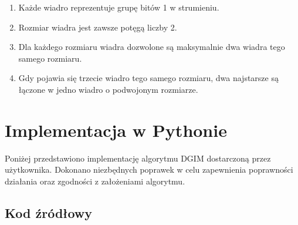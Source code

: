 \documentclass{article}
\begin{document}
\begin{enumerate}
    \item Każde wiadro reprezentuje grupę bitów 1 w strumieniu.
    \item Rozmiar wiadra jest zawsze potęgą liczby 2.
    \item Dla każdego rozmiaru wiadra dozwolone są maksymalnie dwa wiadra tego samego rozmiaru.
    \item Gdy pojawia się trzecie wiadro tego samego rozmiaru, dwa najstarsze są łączone w jedno wiadro o podwojonym rozmiarze.
\end{enumerate}

\section{Implementacja w Pythonie}

Poniżej przedstawiono implementację algorytmu DGIM dostarczoną przez użytkownika. Dokonano niezbędnych poprawek w celu zapewnienia poprawności działania oraz zgodności z założeniami algorytmu.

\subsection{Kod źródłowy}
\end{document}
